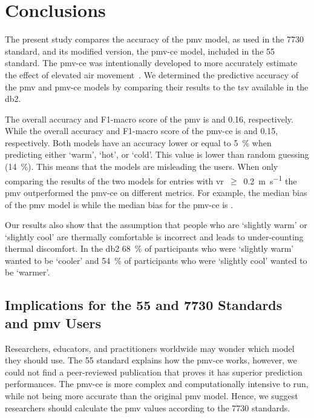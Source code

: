 \section{Conclusions}\label{sec:conclusions}
The present study compares the accuracy of the \ac{pmv} model, as used in the \gls{7730} standard, and its modified version, the \ac{pmv-ce} model, included in the \gls{55} standard.
The \ac{pmv-ce} was intentionally developed to more accurately estimate the effect of elevated air movement~\cite{arens_moving_2009}.
We determined the predictive accuracy of the \ac{pmv} and \ac{pmv-ce} models by comparing their results to the \ac{tsv} available in the \acl{db2}.

The overall accuracy and F1-macro score of the \ac{pmv} is  and \num{.16}, respectively.
While the overall accuracy and F1-macro score of the \ac{pmv-ce} is  and \num{.15}, respectively.
Both models have an accuracy lower or equal to \qty{5}{\percent} when predicting either `warm', `hot', or `cold'.
This value is lower than random guessing (\qty{14}{\percent}).
This means that the models are misleading the users.
When only comparing the results of the two models for entries with \ac{vr}~$\geq$~\qty{0.2}{\m\per\s} the \ac{pmv} outperformed the \ac{pmv-ce} on different metrics.
For example, the median bias of the \ac{pmv} model is  while the median bias for the \ac{pmv-ce} is .

Our results also show that the assumption that people who are `slightly warm' or `slightly cool' are thermally comfortable is incorrect and leads to under-counting thermal discomfort.
In the \ac{db2} \qty{68}{\percent} of participants who were `slightly warm' wanted to be `cooler' and \qty{54}{\percent} of participants who were `slightly cool' wanted to be `warmer'.

\subsection{Implications for the \gls{55} and \gls{7730} Standards and \ac{pmv} Users}\label{subsec:implications-for-the-ashrae-55-and-iso-7730-standards}
Researchers, educators, and practitioners worldwide may wonder which model they should use.
The \gls{55} standard explains how the \ac{pmv-ce} works, however, we could not find a peer-reviewed publication that proves it has superior prediction performances.
The \ac{pmv-ce} is more complex and computationally intensive to run, while not being more accurate than the original \ac{pmv} model.
Hence, we suggest researchers should calculate the \ac{pmv} values according to the \gls{7730} standards.


